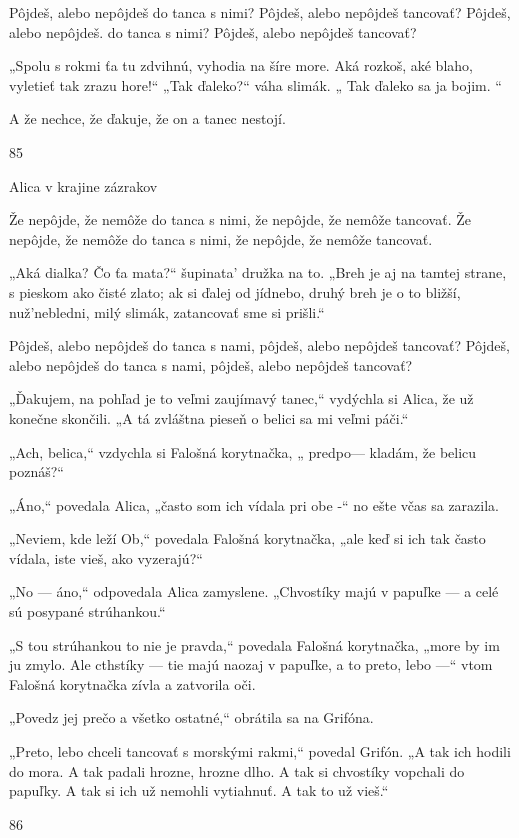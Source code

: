 \documentclass[12pt]{book}
\begin{document}
\begin{Parallel}[p]{}{}
{Pôjdeš, alebo nepôjdeš do tanca s nimi?
Pôjdeš, alebo nepôjdeš tancovať?
Pôjdeš, alebo nepôjdeš. do tanca s nimi?
Pôjdeš, alebo nepôjdeš tancovať?

„Spolu s rokmi ťa tu zdvihnú, vyhodia na šíre more.
Aká rozkoš, aké blaho, vyletieť tak zrazu hore!“
„Tak ďaleko?“ váha slimák. „ Tak ďaleko sa ja bojim. “

A že nechce, že ďakuje, že on a tanec nestojí.

85

 

Alica v krajine zázrakov

Že nepôjde, že nemôže do tanca s nimi,
že nepôjde, že nemôže tancovať.
Že nepôjde, že nemôže do tanca s nimi,
že nepôjde, že nemôže tancovať.

„Aká dialka? Čo ťa mata?“ šupinata' družka na to.
„Breh je aj na tamtej strane, s pieskom ako čisté zlato;
ak si ďalej od jídnebo, druhý breh je o to bližší,  
nuž'nebledni, milý slimák, zatancovať sme si prišli.“

Pôjdeš, alebo nepôjdeš do tanca s nami,
pôjdeš, alebo nepôjdeš tancovať?
Pôjdeš, alebo nepôjdeš do tanca s nami,
pôjdeš, alebo nepôjdeš tancovať?

„Ďakujem, na pohľad je to veľmi zaujímavý tanec,“
vydýchla si Alica, že už konečne skončili. „A tá zvláštna
pieseň o belici sa mi veľmi páči.“

„Ach, belica,“ vzdychla si Falošná korytnačka, „ predpo—
kladám, že belicu poznáš?“

„Áno,“ povedala Alica, „často som ich vídala pri obe -“
no ešte včas sa zarazila.

„Neviem, kde leží Ob,“ povedala Falošná korytnačka,
„ale keď si ich tak často vídala, iste vieš, ako vyzerajú?“

„No — áno,“ odpovedala Alica zamyslene. „Chvostíky
majú v papuľke — a celé sú posypané strúhankou.“

„S tou strúhankou to nie je pravda,“ povedala Falošná
korytnačka, „more by im ju zmylo. Ale cthstíky — tie majú
naozaj v papuľke, a to preto, lebo —“ vtom Falošná
korytnačka zívla a zatvorila oči.

„Povedz jej prečo a všetko ostatné,“ obrátila sa na
Grifóna.

„Preto, lebo chceli tancovať s morskými rakmi,“ povedal
Grifón. „A tak ich hodili do mora. A tak padali hrozne,
hrozne dlho. A tak si chvostíky vopchali do papuľky. A tak
si ich už nemohli vytiahnuť. A tak to už vieš.“

86

}
\end{Parallel}
\end{document}
